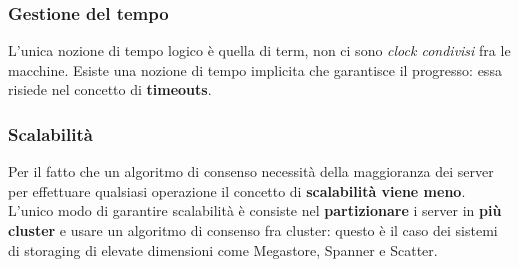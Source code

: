   \subsubsection{Gestione del tempo}
  L'unica nozione di tempo logico è quella di term, non ci sono \textit{clock condivisi} fra le macchine. Esiste una nozione di tempo implicita che garantisce il progresso: essa risiede nel concetto di \textbf{timeouts}.

  \subsubsection{Scalabilità}
  Per il fatto che un algoritmo di consenso necessità della maggioranza dei server per effettuare qualsiasi operazione il concetto di \textbf{scalabilità viene meno}. L'unico modo di garantire scalabilità è consiste nel \textbf{partizionare} i server in \textbf{più cluster} e usare un algoritmo di consenso fra cluster: questo è il caso dei sistemi di storaging di elevate dimensioni come Megastore, Spanner e Scatter.